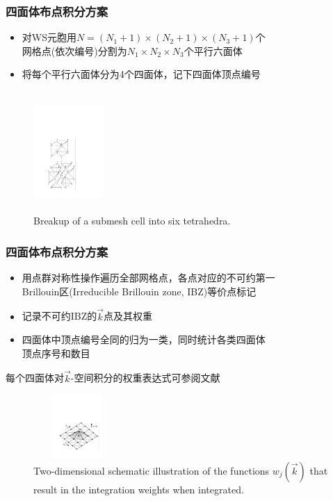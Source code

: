 \documentclass[cjk,slidestop,compress,mathserif,blue]{beamer}
\begin{document}
\frame
{
\frametitle{四面体布点积分方案}
\begin{itemize}
\setlength{\itemsep}{5pt}
	\item 对\textrm{WS}元胞用$N=(N_1+1)\times(N_2+1)\times(N_3+1)$个\\网格点(依次编号)分割为$N_1\times N_2\times N_3$个平行六面体
	\item 将每个平行六面体分为4个四面体，记下四面体顶点编号
\end{itemize}
\begin{figure}[h!]
\centering
\hspace*{-10pt}
\vspace*{-10pt}
\includegraphics[height=1.8in,width=1.05in,viewport=120 60 360 505,clip]{Figures/submesh_Tetra.pdf}
\caption{\small \textrm{Breakup of a submesh cell into six tetrahedra.}}%
\label{Tetrahedron_split}
\end{figure}
}

\frame
{
\frametitle{四面体布点积分方案}
\begin{itemize}
\setlength{\itemsep}{10pt}
	\item 用点群对称性操作遍历全部网格点，各点对应的不可约第一\\\textrm{Brillouin}区\textrm{(Irreducible Brillouin zone, IBZ)}等价点标记
	\item 记录不可约\textrm{IBZ}的$\vec k$点及其权重
	\item 四面体中顶点编号全同的归为一类，同时统计各类四面体\\顶点序号和数目
\end{itemize}
每个四面体对$\vec k$-空间积分的权重表达式可参阅文献\cite{PRB49-16233_1994}
\begin{figure}[h!]
\centering
\includegraphics[height=0.95in,width=1.32in,viewport=85 99 560 460,clip]{Figures/dimen_Tetra.pdf}
\caption{\small \textrm{Two-dimensional schematic illustration of the functions $w_j(\vec k)$ that result in the integration weights when integrated.}}%
\label{Tetrahedron_weight}
\end{figure}
}
\end{document}
